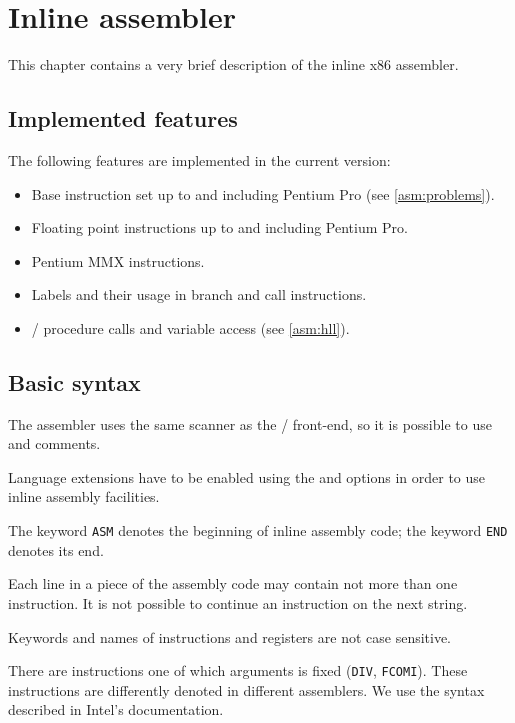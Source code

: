 \chapter{Inline assembler}
\label{asm}

This chapter contains a very brief description of the inline x86 assembler.

\section{Implemented features}

The following features are implemented in the current version:
\begin{itemize}
\item Base instruction set up to and including Pentium Pro (see \ref{asm:problems}).
\item Floating point instructions up to and including Pentium Pro.
\item Pentium MMX instructions.
\item Labels and their usage in branch and call instructions.
\item \mt{}/\ot{} procedure calls and variable access (see \ref{asm:hll}).
\end{itemize}

\section{Basic syntax}

The assembler uses the same scanner as the \mt{}/\ot{} front-end,
so it is possible to use 
and comments.

Language extensions have to be enabled using the 
and  options in order to use inline assembly facilities.

The keyword \verb'ASM' denotes the beginning of inline assembly code;
the keyword \verb'END' denotes its end.

Each line in a piece of the assembly code may contain not more than
one instruction. It is not possible to continue an instruction on the next string.

Keywords and names of instructions and registers are not case sensitive.

There are instructions one of which arguments is fixed (\verb'DIV', \verb'FCOMI').
These instructions are differently denoted in different assemblers. We use
the syntax described in Intel's documentation.

